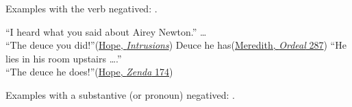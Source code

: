 Examples with the verb negatived: .

\ea \label{ex:04-189}
\ea
``I heard what you said about Airey Newton.'' {\dots}\\``The deuce you did!''\hfill(\href{https://archive.org/details/intrusionspeggy02hopegoog/page/n148/mode/2up?q=\%22I+heard+what+you+said\%22&view=theater}{Hope, \textit{Intrusions}}) %
\ex
Deuce he has\hfill(\href{https://archive.org/details/ordealofrichardf0000geor_q5z1/page/376/mode/2up?q=\%22Deuce+he+has\%22&view=theater}{Meredith, \textit{Ordeal} 287})
\ex
``He lies in his room upstairs {\dots}.''\\``The deuce he does!''\hfill(\href{https://archive.org/details/prisonerzendabe01hopegoog/page/n180/mode/2up?q=\%22he+lies+in+his+room\%22&view=theater}{Hope, \textit{Zenda} 174}) %
\z
\z

Examples with a substantive (or pronoun) negatived: .\largerpage

